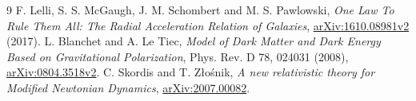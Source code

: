 \documentclass[11pt]{article}
\begin{document}
\begin{thebibliography}{9}
 F. Lelli, S. S. McGaugh, J. M. Schombert and M. S. Pawlowski, \emph{One Law To Rule Them All: The Radial Acceleration Relation of Galaxies}, \href{https://arxiv.org/abs/1610.08981v2}{arXiv:1610.08981v2} (2017).
 L. Blanchet and A. Le Tiec, \emph{Model of Dark Matter and Dark Energy Based on Gravitational Polarization}, Phys. Rev. D 78, 024031 (2008), \href{https://arxiv.org/abs/0804.3518v2}{arXiv:0804.3518v2}.
 C. Skordis and T. Z\l{}o\'{s}nik, \emph{A new relativistic theory for Modified Newtonian Dynamics}, \href{https://arxiv.org/abs/2007.00082}{arXiv:2007.00082}.
\end{thebibliography}
\end{document}
